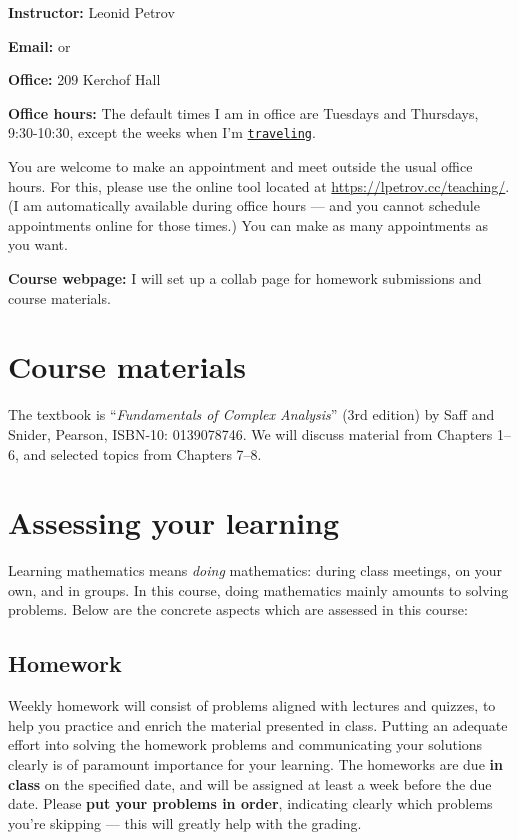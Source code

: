 \documentclass[oneside,11pt]{amsart}
\begin{document}
\medskip

\textbf{Instructor:} Leonid Petrov
\medskip

\textbf{Email:}  or 
\medskip

\textbf{Office:} 209 Kerchof Hall
\medskip


\textbf{Office hours:}
The default times I am in office are Tuesdays and Thursdays, 9:30-10:30,
except the weeks when I'm \href{https://lpetrov.cc/2019/05/travel-2020/}{\texttt{traveling}}.

You are welcome to make an appointment and meet outside the usual office hours. 
For this, please use the online tool located at
\url{https://lpetrov.cc/teaching/}. (I am automatically available during office hours --- 
and you cannot schedule appointments online for those times.)
You can make as 
many appointments as you want.

\medskip

\textbf{Course webpage:}
I will set up a collab page for homework submissions and course materials.

\section{Course materials}

The textbook is “\emph{Fundamentals of Complex Analysis}” (3rd edition)
by Saff and Snider, Pearson, ISBN-10: 0139078746.
We will discuss material from Chapters 1--6, and selected topics from Chapters 7--8.

\section{Assessing your learning}

Learning mathematics means \emph{doing} mathematics: during class meetings, on your own, and in groups. 
In this course, doing mathematics mainly amounts to solving problems. 
Below are the concrete aspects which are assessed in this course:

\subsection{Homework}

Weekly homework will consist of
problems aligned with lectures and quizzes,
to help you practice and enrich the material presented in class.
Putting an adequate effort into solving the homework
problems and
communicating your solutions clearly is
of paramount importance for your learning.
The homeworks are due \textbf{in class} on the specified date, and will be assigned at least a week before the due
date. 
Please \textbf{put your problems in order}, indicating clearly which problems you're skipping --- this will greatly help with the grading.
\end{document}
